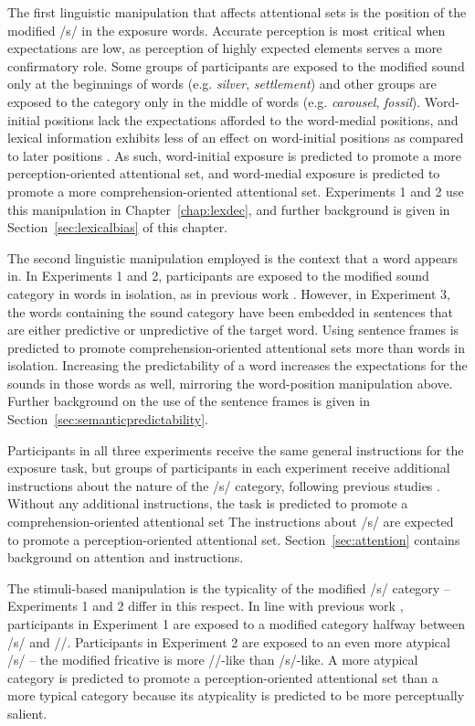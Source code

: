 The first linguistic manipulation that affects attentional sets is the position of the modified /s/ in the exposure words.  
Accurate perception is most critical when expectations are low, as perception of highly expected elements serves a more confirmatory role.
Some groups of participants are exposed to the modified sound only at the beginnings of words (e.g. \emph{silver}, \emph{settlement}) and other groups are exposed to the category only in the middle of words (e.g. \emph{carousel}, \emph{fossil}).
Word-initial positions lack the expectations afforded to the word-medial positions, and lexical information exhibits less of an effect on word-initial positions as compared to later positions \citep{Pitt2006}.
As such, word-initial exposure is predicted to promote a more perception-oriented attentional set, and word-medial exposure is predicted to promote a more comprehension-oriented attentional set.  
Experiments 1 and 2 use this manipulation in Chapter~\ref{chap:lexdec}, and further background is given in Section~\ref{sec:lexicalbias} of this chapter.

The second linguistic manipulation employed is the context that a word appears in.  
In Experiments 1 and 2, participants are exposed to the modified sound category in words in isolation, as in previous work \citep{Norris2003}.  
However, in Experiment 3, the words containing the sound category have been embedded in sentences that are either predictive or unpredictive of the target word.
Using sentence frames is predicted to promote comprehension-oriented attentional sets more than words in isolation.
Increasing the predictability of a word increases the expectations for the sounds in those words as well, mirroring the word-position manipulation above.
Further background on the use of the sentence frames is given in Section~\ref{sec:semanticpredictability}.

Participants in all three experiments receive the same general instructions for the exposure task, but groups of participants in each experiment receive additional instructions about the nature of the /s/ category, following previous studies \citep{Pitt2012}.
Without any additional instructions, the task is predicted to promote a comprehension-oriented attentional set
The instructions about /s/ are expected to promote a perception-oriented attentional set.
Section~\ref{sec:attention} contains background on attention and instructions.

The stimuli-based manipulation is the typicality of the modified /s/ category -- Experiments 1 and 2 differ in this respect. 
In line with previous work \citep{Norris2003}, participants in Experiment 1 are exposed to a modified category halfway between /s/ and /\textesh/. 
Participants in Experiment 2 are exposed to an even more atypical /s/ -- the modified fricative is more /\textesh/-like than /s/-like.  
A more atypical category is predicted to promote a perception-oriented attentional set than a more typical category because its atypicality is predicted to be more perceptually salient.

